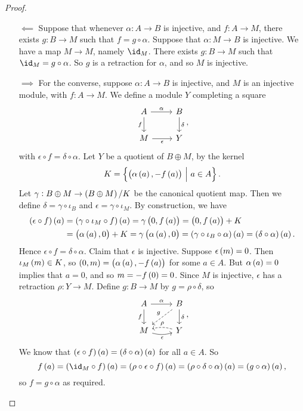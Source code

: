 \begin{proof}
\hfill
\begin{itemize}
\item[$ \impliedby $] Suppose that whenever $ \alpha : A \to B $ is injective, and $ f : A \to M $, there exists $ g : B \to M $ such that $ f = g \circ \alpha $. Suppose that $ \alpha : M \to B $ is injective. We have a map $ M \to M $, namely $ \id_M $. There exists $ g : B \to M $ such that $ \id_M = g \circ \alpha $. So $ g $ is a retraction for $ \alpha $, and so $ M $ is injective.
\item[$ \implies $] For the converse, suppose $ \alpha : A \to B $ is injective, and $ M $ is an injective module, with $ f : A \to M $. We define a module $ Y $ completing a square
$$
\begin{tikzcd}
A \arrow{r}{\alpha} \arrow{d}[swap]{f} & B \arrow{d}{\delta} \\
M \arrow{r}[swap]{\epsilon} & Y
\end{tikzcd},
$$
with $ \epsilon \circ f = \delta \circ \alpha $. Let $ Y $ be a quotient of $ B \oplus M $, by the kernel
$$ K = \cbr{\br{\alpha\br{a}, -f\br{a}} \st a \in A}. $$
Let $ \gamma : B \oplus M \to \br{B \oplus M} / K $ be the canonical quotient map. Then we define $ \delta = \gamma \circ \iota_B $ and $ \epsilon = \gamma \circ \iota_M $. By construction, we have
\begin{align*}
\br{\epsilon \circ f}\br{a}
& = \br{\gamma \circ \iota_M \circ f}\br{a}
= \gamma\br{0, f\br{a}}
= \br{0, f\br{a}} + K \\
& = \br{\alpha\br{a}, 0} + K
= \gamma\br{\alpha\br{a}, 0}
= \br{\gamma \circ \iota_B \circ \alpha}\br{a}
= \br{\delta \circ \alpha}\br{a}.
\end{align*}
Hence $ \epsilon \circ f = \delta \circ \alpha $. Claim that $ \epsilon $ is injective. Suppose $ \epsilon\br{m} = 0 $. Then $ \iota_M\br{m} \in K $, so $ \br{0, m} = \br{\alpha\br{a}, -f\br{a}} $ for some $ a \in A $. But $ \alpha\br{a} = 0 $ implies that $ a = 0 $, and so $ m = -f\br{0} = 0 $. Since $ M $ is injective, $ \epsilon $ has a retraction $ \rho : Y \to M $. Define $ g : B \to M $ by $ g = \rho \circ \delta $, so
$$
\begin{tikzcd}
A \arrow{r}{\alpha} \arrow{d}[swap]{f} & B \arrow[dashed]{dl}[swap]{g} \arrow{d}{\delta} \\
M \arrow[bend right=15]{r}[swap]{\epsilon} & Y \arrow[bend right=15, dashed]{l}[swap]{\rho}
\end{tikzcd},
$$
We know that $ \br{\epsilon \circ f}\br{a} = \br{\delta \circ \alpha}\br{a} $ for all $ a \in A $. So
$$ f\br{a} = \br{\id_M \circ f}\br{a} = \br{\rho \circ \epsilon \circ f}\br{a} = \br{\rho \circ \delta \circ \alpha}\br{a} = \br{g \circ \alpha}\br{a}, $$
so $ f = g \circ \alpha $ as required.
\end{itemize}
\end{proof}

